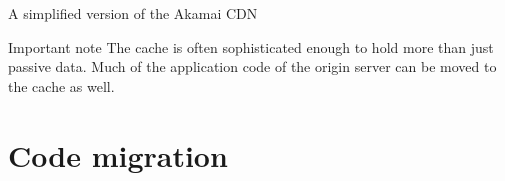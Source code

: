 \begin{slide}{A simplified version of the Akamai CDN}
  \begin{centerfig}
  \end{centerfig}
  \onslide
  \begin{alertblock}{Important note}
    The cache is often sophisticated enough to hold more than just passive data. Much of the application code
    of the origin server can be moved to the cache as well.
  \end{alertblock}
\end{slide}
\section{Code migration}

